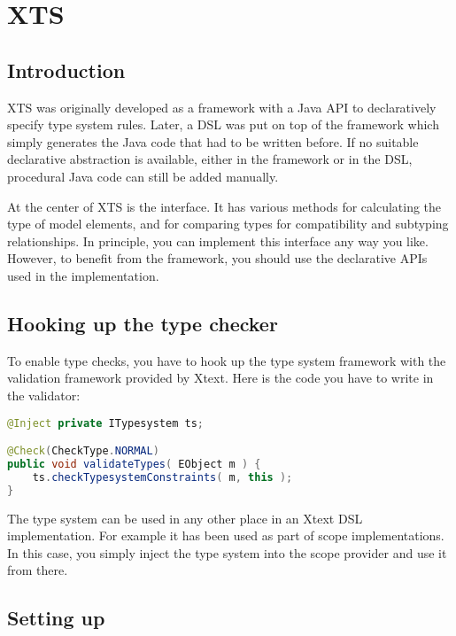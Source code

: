 \section{XTS}
\label{sec:xts}

\subsection{Introduction}

XTS was originally developed as a framework with a Java API to declaratively
specify type system rules. Later, a DSL was put on top of the framework which
simply generates the Java code that had to be written before.
If no suitable declarative abstraction is available, either in the framework or
in the DSL, procedural Java code can still be added manually.

At the center of XTS is the  interface. It has various methods for
calculating the type of model elements, and for comparing types for
compatibility and subtyping relationships. In principle, you can implement this
interface any way you like. However, to benefit from the framework, you should
use the declarative APIs used in the  implementation.

\subsection{Hooking up the type checker}

To enable type checks, you have to hook up the type system framework  with the
validation  framework provided by Xtext. Here is the code you have to write in
the validator:

\begin{lstlisting}[language=Java] 
@Inject private ITypesystem ts;

@Check(CheckType.NORMAL)
public void validateTypes( EObject m ) {
    ts.checkTypesystemConstraints( m, this );
}    
\end{lstlisting}

The type system can be used in any other place in an Xtext DSL implementation.
For example it has been used as part of scope implementations. In this case, you
simply inject the type system into the scope provider and use it from there.

\subsection{Setting up}

